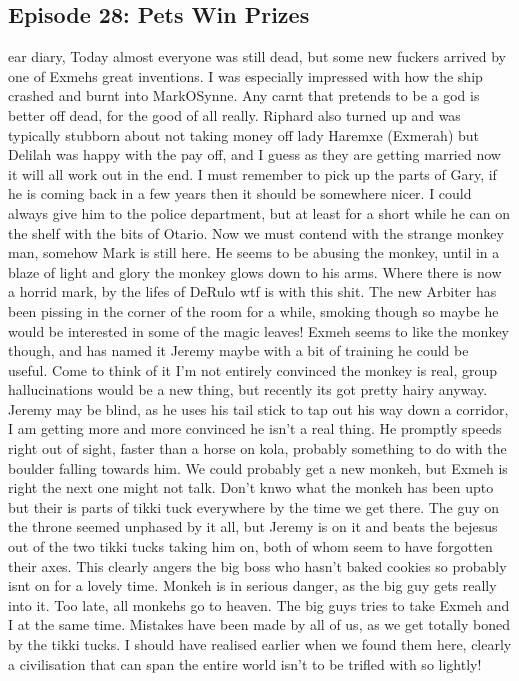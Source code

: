 \subsection{Episode 28: Pets Win Prizes}
ear diary,\medskip
Today almost everyone was still dead, but some new fuckers arrived by one of Exmehs great inventions. I was especially impressed with how the ship crashed and burnt into MarkOSynne. Any carnt that pretends to be a god is better off dead, for the good of all really.\medskip
Riphard also turned up and was typically stubborn about not taking money off lady Haremxe (Exmerah) but Delilah was happy with the pay off, and I guess as they are getting married now it will all work out in the end.\medskip
I must remember to pick up the parts of Gary, if he is coming back in a few years then it should be somewhere nicer. I could always give him to the police department, but at least for a short while he can on the shelf with the bits of Otario.\medskip
Now we must contend with the strange monkey man, somehow Mark is still here. He seems to be abusing the monkey, until in a blaze of light and glory the monkey glows down to his arms. Where there is now a horrid mark, by the lifes of DeRulo wtf is with this shit.\medskip
The new Arbiter has been pissing in the corner of the room for a while, smoking though so maybe he would be interested in some of the magic leaves!\medskip
Exmeh seems to like the monkey though, and has named it Jeremy maybe with a bit of training he could be useful. Come to think of it I’m not entirely convinced the monkey is real, group hallucinations would be a new thing, but recently its got pretty hairy anyway.\medskip
Jeremy may be blind, as he uses his tail stick to tap out his way down a corridor, I am getting more and more convinced he isn’t a real thing. He promptly speeds right out of sight, faster than a horse on kola, probably something to do with the boulder falling towards him. We could probably get a new monkeh, but Exmeh is right the next one might not talk.\medskip
Don’t knwo what the monkeh has been upto but their is parts of tikki tuck everywhere by the time we get there. The guy on the throne seemed unphased by it all, but Jeremy is on it and beats the bejesus out of the two tikki tucks taking him on, both of whom seem to have forgotten their axes. This clearly angers the big boss who hasn’t baked cookies so probably isnt on for a lovely time. Monkeh is in serious danger, as the big guy gets really into it. Too late, all monkehs go to heaven.\medskip
The big guys tries to take Exmeh and I at the same time. Mistakes have been made by all of us, as we get totally boned by the tikki tucks. I should have realised earlier when we found them here, clearly a civilisation that can span the entire world isn’t to be trifled with so lightly!\medskip
